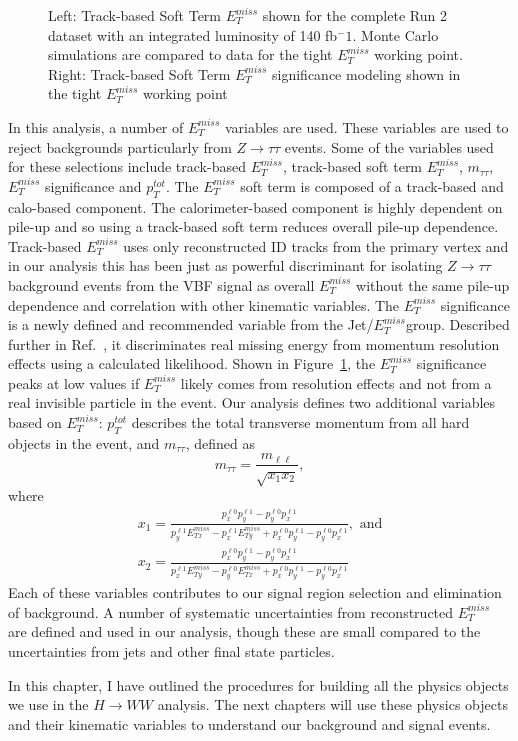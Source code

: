 \begin{figure}[!h]
\begin{minipage}[b]{0.45\textwidth}
  \end{minipage}
    \caption{ Left: Track-based Soft Term $E_T^{miss}$ shown for the complete Run 2 dataset with an integrated luminosity of 140 fb$^-1$. Monte Carlo simulations are compared to data for the tight $E_T^{miss}$ working point. Right: Track-based Soft Term $E_T^{miss}$ significance modeling shown in the tight $E_T^{miss}$ working point ~\cite{JETEtmiss}}
    \label{fig:METPerf}
\end{figure}

In this analysis, a number of $E_T^{miss}$ variables are used. These variables are used to reject backgrounds particularly from $Z\rightarrow \tau\tau$ events. Some of the variables used for these selections include track-based $E_T^{miss}$, track-based soft term $E_T^{miss}$, $m_{\tau\tau}$, $E_T^{miss}$ significance and $p_T^{tot}$. The $E_T^{miss}$ soft term is composed of a track-based and calo-based component. The calorimeter-based component is highly dependent on pile-up and so using a track-based soft term reduces overall pile-up dependence. Track-based $E_T^{miss}$ uses only reconstructed ID tracks from the primary vertex and in our analysis this has been just as powerful discriminant for isolating $Z\rightarrow \tau\tau$ background events from the VBF signal as overall $E_T^{miss}$ without the same pile-up dependence and correlation with other kinematic variables. The $E_T^{miss}$ significance is a newly defined and recommended variable from the Jet/$E_T^{miss}$group. Described further in Ref.~\cite{METSig}, it discriminates real missing energy from momentum resolution effects using a calculated likelihood. Shown in Figure~\ref{fig:METPerf}, the $E_T^{miss}$ significance peaks at low values if $E_T^{miss}$ likely comes from resolution effects and not from a real invisible particle in the event. Our analysis defines two additional variables based on $E_T^{miss}$: $p_T^{tot}$ describes the total transverse momentum from all hard objects in the event, and $m_{\tau\tau}$, defined as
\begin{equation}
m_{\tau\tau} = \frac{m_{\ell\ell}}{\sqrt{x_1 x_2}},
\end{equation}
where 
\begin{equation}
\begin{split}
x_1 = \frac{p^{\ell0}_x p^{\ell1}_y-p^{\ell0}_y p^{\ell1}_x}{p^{\ell1}_y E_{Tx}^{miss}-p^{\ell1}_x E_{Ty}^{miss}+p^{\ell0}_x p^{\ell1}_y-p^{\ell0}_y p^{\ell1}_x}, \text{ and} \\
x_2 = \frac{p^{\ell0}_x p^{\ell1}_y-p^{\ell0}_y p^{\ell1}_x}{p^{\ell1}_x E_{Ty}^{miss}-p^{\ell0}_y E_{Tx}^{miss}+p^{\ell0}_x p^{\ell1}_y-p^{\ell0}_y p^{\ell1}_x}
\end{split}
\end{equation}
Each of these variables contributes to our signal region selection and elimination of background. A number of systematic uncertainties from reconstructed $E_T^{miss}$ are defined and used in our analysis, though these are small compared to the uncertainties from jets and other final state particles.

In this chapter, I have outlined the procedures for building all the physics objects we use in the $H\rightarrow WW$ analysis. The next chapters will use these physics objects and their kinematic variables to understand our background and signal events.
 
